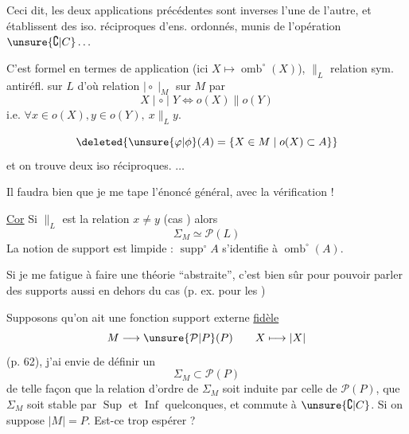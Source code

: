 Ceci dit, les deux applications précédentes sont inverses l'une de l'autre, et établissent des iso. réciproques d'ens. ordonnés, munis de l'opération $\unsure{\complement|C}\ldots$

C'est formel en termes de
application (ici $X\mapsto\operatorname{omb}^{\circ}(X)$), $\mathrel{\|}_L$ relation sym. antiréfl. sur $L$ d'où relation $\mid\circ\mid_M$ sur $M$ par
\[
 X\mid\circ\mid Y\Longleftrightarrow o(X)\mathrel{\|}o(Y)
\]
i.e. $\forall x\in o(X),y\in o(Y),\ x\mathrel{\|}_L y$.

\[
\deleted{\unsure{\varphi|\phi}(A)=\{X\in M\mid o(X)\subset A\}}
\]
et on trouve  deux iso  réciproques.
\hfill $\ldots$

Il faudra bien que je me tape l'énoncé général, avec la vérification !

\uline{Cor} Si $\mathrel{\|}_L$ est la relation $x\ne y$ (cas ) alors
\[
\Sigma_M\simeq\mathcal{P}(L)
\]
La notion de support est limpide : $\operatorname{supp}^{\circ}A$ s'identifie à $\operatorname{omb}^{\circ}(A)$.

Si je me fatigue à faire une théorie ``abstraite'', c'est bien sûr pour pouvoir parler des supports aussi en dehors du cas  (p. ex. pour les  \unsure{\ldots})

Supposons qu'on ait une fonction support externe \uline{fidèle}
\[
 M\longrightarrow\unsure{\mathcal{P}|P}(P)\qquad X\longmapsto|X|
\]
(p. 62), j'ai envie  de définir un 
\[
 \Sigma_M\subset\mathcal{P}(P)
\]
de telle façon que la relation d'ordre de $\Sigma_M$ soit induite par celle de $\mathcal{P}(P)$, que $\Sigma_M$ soit stable par $\operatorname{Sup}$ et $\operatorname{Inf}$ quelconques, et commute à $\unsure{\complement|C}$. Si on suppose $|M|=P$. Est-ce trop espérer ?

